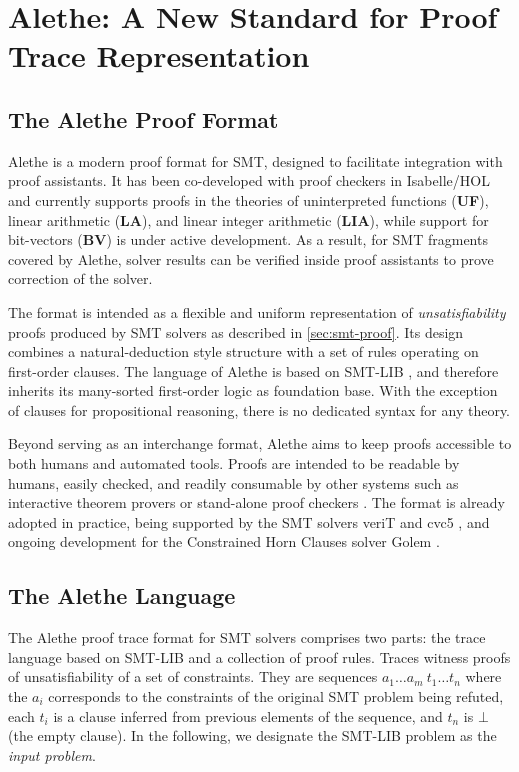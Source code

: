 \chapter{Alethe: A New Standard for Proof Trace Representation}\label{ch:alethe}

\section{The Alethe Proof Format}

Alethe \cite{alethe,alethe2} is a modern proof format for SMT, designed to facilitate integration with proof assistants.
It has been co-developed with proof checkers in Isabelle/HOL \cite{aletheInIsa} and currently supports proofs in the theories of uninterpreted functions (\textbf{UF}), linear arithmetic (\textbf{LA}), and linear integer arithmetic (\textbf{LIA}), while support for bit-vectors (\textbf{BV}) is under active development.
As a result, for SMT fragments covered by Alethe, solver results can be verified inside proof assistants to prove correction of the solver.

The format is intended as a flexible and uniform representation of \emph{unsatisfiability} proofs produced by SMT solvers as described in \cref{sec:smt-proof}.
Its design combines a natural-deduction style structure with a set of rules operating on first-order clauses.
The language of Alethe is based on SMT-LIB \cite{smtlib}, and therefore inherits its many-sorted first-order logic as foundation base.
With the exception of clauses for propositional reasoning, there is no dedicated syntax for any theory.

Beyond serving as an interchange format, Alethe aims to keep proofs accessible to both humans and automated tools.
Proofs are intended to be readable by humans, easily checked, and readily consumable by other systems such as interactive theorem provers or stand-alone proof checkers \cite{carcara}.
The format is already adopted in practice, being supported by the SMT solvers veriT \cite{verit} and cvc5 \cite{cvc5}, and ongoing development for the Constrained Horn Clauses solver Golem \cite{golem}.

\section{The Alethe Language}

The Alethe proof trace format \cite{alethespec} for SMT solvers comprises two parts: the trace language based on SMT-LIB and a collection of proof rules. Traces witness proofs of unsatisfiability of a set of constraints.
They are sequences $a_1 \dots a_m~t_1 \dots t_n$ where
the $a_i$ corresponds to the constraints of the original SMT problem being refuted, each $t_i$ is a clause inferred from previous elements of the sequence, and $t_n$ is $\bot$ (the empty clause).
In the following, we designate the SMT-LIB problem as the \emph{input problem}.

